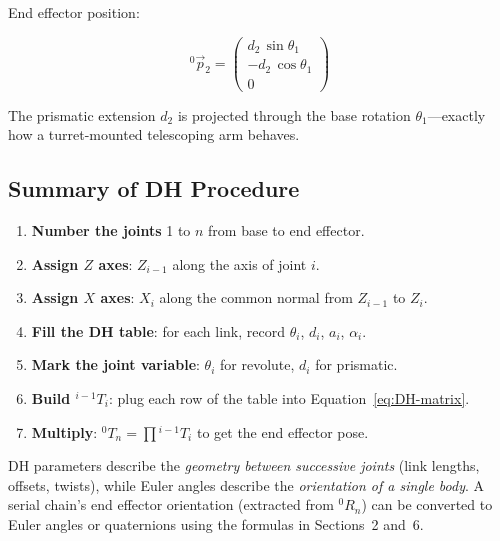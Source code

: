 \documentclass[12pt,a4paper]{article}
\begin{document}
End effector position:

\begin{equation}
\boxed{
  {}^{0}\vec{p}_2 =
  \begin{pmatrix}
    d_2\,\sin\theta_1 \\ -d_2\,\cos\theta_1 \\ 0
  \end{pmatrix}
}
\end{equation}

The prismatic extension $d_2$ is projected through the base rotation
$\theta_1$---exactly how a turret-mounted telescoping arm behaves.

\subsection{Summary of DH Procedure}

\begin{enumerate}
  \item \textbf{Number the joints} 1 to $n$ from base to end effector.
  \item \textbf{Assign $Z$ axes}: $Z_{i-1}$ along the axis of joint $i$.
  \item \textbf{Assign $X$ axes}: $X_i$ along the common normal from
        $Z_{i-1}$ to $Z_i$.
  \item \textbf{Fill the DH table}: for each link, record
        $\theta_i$, $d_i$, $a_i$, $\alpha_i$.
  \item \textbf{Mark the joint variable}: $\theta_i$ for revolute,
        $d_i$ for prismatic.
  \item \textbf{Build ${}^{i-1}T_i$}: plug each row of the table into
        Equation~\eqref{eq:DH-matrix}.
  \item \textbf{Multiply}: ${}^{0}T_n = \prod {}^{i-1}T_i$ to get the
        end effector pose.
\end{enumerate}

\begin{keybox}
DH parameters describe the \emph{geometry between successive joints}
(link lengths, offsets, twists), while Euler angles describe the
\emph{orientation of a single body}.  A serial chain's end effector
orientation (extracted from ${}^{0}R_n$) can be converted to Euler
angles or quaternions using the formulas in Sections~2 and~6.
\end{keybox}
\end{document}
